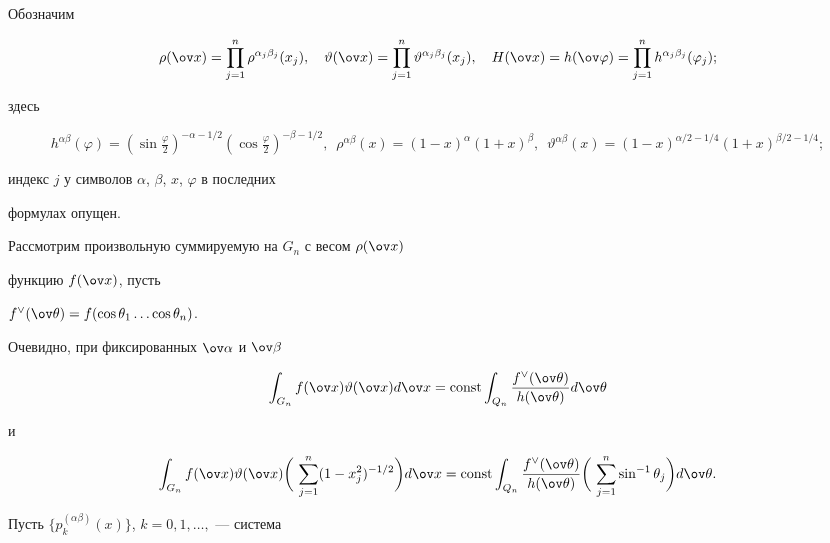 Обозначим 


$$ 


\rho(\ov x)=\prod^n_{j=1}\rho^{\alpha_j\beta_j}(x_j),\quad 


\vartheta(\ov x)=\prod^n_{j=1} 


\vartheta^{\alpha_j\beta_j}(x_j),\quad 


H(\ov x)=h(\ov\varphi)=\prod^n_{j=1} 


h^{\alpha_j\beta_j}(\varphi_j); 


$$ 


здесь 


$$ 


h^{\alpha\beta}(\varphi)= 


(\sin\tfrac{\varphi}{2})^{-\alpha-1/2} 


(\cos\tfrac{\varphi}{2})^{-\beta-1/2},\ \;


\rho^{\alpha\beta}(x)=(1-x)^\alpha(1+x)^\beta,\ \;


\vartheta^{\alpha\beta}(x)=(1-x)^{\alpha/2-1/4} 


(1+x)^{\beta/2-1/4}; 


$$ 


индекс $j$ у символов $\alpha$, $\beta$, $x$, $\varphi$ в последних 


формулах опущен. 


 


Рассмотрим произвольную суммируемую на $G_n$ с весом $\rho(\ov x)$ 


функцию $f(\ov x)$, пусть 


$f^\vee(\ov\theta)=f(\cos\theta_1\dotsc\cos\theta_n)$. 


Очевидно, при фиксированных $\ov\alpha$ и $\ov\beta$ 


$$ 


\int_{G_n}f(\ov x)\vartheta(\ov x)d\ov x=\const 


\int_{Q_n}\frac{f^\vee(\ov\theta)}{h(\ov\theta)}d\ov\theta


$$


и


$$


\int_{G_n}f(\ov x)\vartheta(\ov x) 


\bigg(\,\sum^n_{j=1}(1-x^2_j)^{-1/2}\bigg)d\ov x= 


\const\int_{Q_n}\frac{f^\vee(\ov\theta)}{h(\ov\theta)} 


\bigg(\,\sum^n_{j=1}\sin^{-1}\theta_j\bigg)d\ov\theta. 


$$ 


Пусть $\{p^{(\alpha\beta)}_k(x)\}$, $k=0,1,\dotsc,$ --- система 


